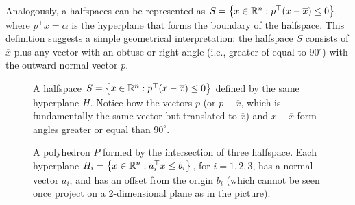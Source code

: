 	Analogously, a halfspaces can be represented as $S = \left\{ x \in \mathbb{R}^n : p^\top(x - \overline{x}) \le 0 \right \}$ where $p^\top \overline{x} = \alpha$ is the hyperplane that forms the boundary of the halfspace. This definition suggests a simple geometrical interpretation: the halfspace $S$ consists of $\overline{x}$ plus any vector with an obtuse or right angle (i.e., greater of equal to 90$^\circ$) with the outward normal vector $p$.
 
 	\begin{figure}[H]
		\caption{A halfspace $S = \left\{ x \in \mathbb{R}^n : p^\top(x - \overline{x}) \le 0 \right \}$ defined by the same hyperplane $H$. Notice how the vectors $p$ (or $p - \overline{x}$, which is fundamentally the same vector but translated to $\overline{x}$) and $x - \overline{x}$ form angles greater or equal than $90^\circ$.}
	\end{figure}
	
	\begin{figure}[H]
    \caption{A polyhedron $P$ formed by the intersection of three halfspace. Each hyperplane $H_i = \left\{ x \in \mathbb{R}^n : a_i^\top x \leq b_i \right \}$, for $i = 1,2,3$, has a normal vector $a_i$, and has an offset from the origin $b_i$ (which cannot be seen once project on a 2-dimensional plane as in the picture).} \label{fig:polyhedral_set}
\end{figure}


